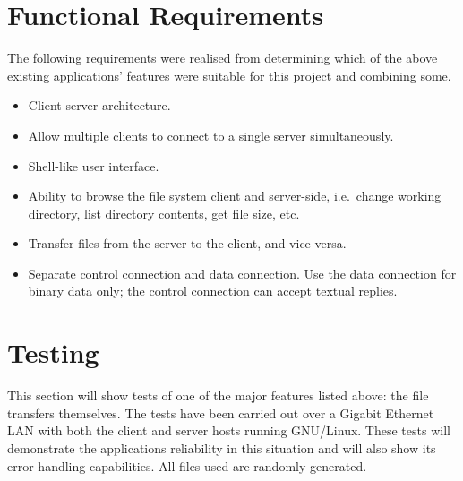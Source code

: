 \documentclass[a4paper]{article}
\begin{document}
\section{Functional Requirements}

The following requirements were realised from determining which of the above existing applications' features were suitable for this project and combining some.

\begin{itemize}
 \item Client-server architecture.
 \item Allow multiple clients to connect to a single server simultaneously.
 \item Shell-like user interface.
 \item Ability to browse the file system client and server-side, i.e.\ change working directory, list directory contents, get file size, etc.
 \item Transfer files from the server to the client, and vice versa.
 \item Separate control connection and data connection. Use the data connection for binary data only; the control connection can accept textual replies.
\end{itemize}


\section{Testing}

This section will show tests of one of the major features listed above: the file transfers themselves. The tests have been carried out over a Gigabit Ethernet LAN with both the client and server hosts running GNU/Linux. These tests will demonstrate the applications reliability in this situation and will also show its error handling capabilities. All files used are randomly generated.
\end{document}
